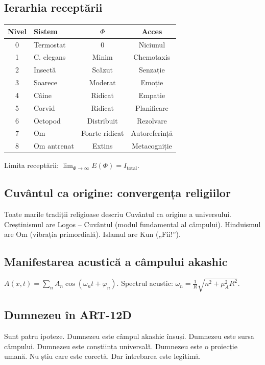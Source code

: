 \documentclass[11pt,a4paper]{article}
\begin{document}
\subsection{Ierarhia receptării}
\begin{table}[H]
\centering
\begin{tabular}{@{}clcc@{}}
\toprule
\textbf{Nivel} & \textbf{Sistem} & \textbf{$\Phi$} & \textbf{Acces} \\ \midrule
0 & Termostat & 0 & Niciunul \\
1 & C. elegans & Minim & Chemotaxis \\
2 & Insectă & Scăzut & Senzație \\
3 & Șoarece & Moderat & Emoție \\
4 & Câine & Ridicat & Empatie \\
5 & Corvid & Ridicat & Planificare \\
6 & Octopod & Distribuit & Rezolvare \\
7 & Om & Foarte ridicat & Autoreferință \\
8 & Om antrenat & Extins & Metacogniție \\ \bottomrule
\end{tabular}
\end{table}
Limita receptării: $\lim_{\Phi \rightarrow \infty} E(\Phi) = I_{\text{total}}$.

\subsection{Cuvântul ca origine: convergența religiilor}
Toate marile tradiții religioase descriu Cuvântul ca origine a universului. Creștinismul are Logos – Cuvântul (modul fundamental al câmpului). Hinduismul are Om (vibrația primordială). Islamul are Kun („Fii!”).

\subsection{Manifestarea acustică a câmpului akashic}
$A(x,t) = \sum_n A_n \cos(\omega_n t + \varphi_n)$. Spectrul acustic: $\omega_n = \frac{1}{R} \sqrt{n^2 + \mu_A^2 R^2}$.

\subsection{Dumnezeu în ART-12D}
Sunt patru ipoteze. Dumnezeu este câmpul akashic însuși. Dumnezeu este sursa câmpului. Dumnezeu este conștiința universală. Dumnezeu este o proiecție umană. Nu știu care este corectă. Dar întrebarea este legitimă.
\end{document}
